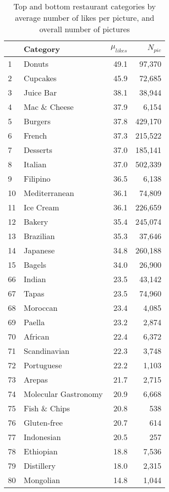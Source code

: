 \documentclass{sig-alternate-2013}
\begin{document}
\begin{table}[t]
\caption{Top and bottom restaurant categories by average number of likes per picture, and overall number of pictures
\label{tbl:categorylikes}}
\begin{center}
\footnotesize
\begin{tabular}{llrr}
\toprule
 & \textbf{Category} & \textbf{$\mu_{likes}$} & \textbf{$N_{pic}$} \\
\midrule
1 & Donuts & 49.1 & 97,370 \\
2 & Cupcakes & 45.9 & 72,685 \\
3 & Juice Bar & 38.1 & 38,944 \\
4 & Mac \& Cheese & 37.9 & 6,154 \\
5 & Burgers & 37.8 & 429,170 \\
6 & French & 37.3 & 215,522 \\
7 & Desserts & 37.0 & 185,141 \\
8 & Italian & 37.0 & 502,339 \\
9 & Filipino & 36.5 & 6,138 \\
10 & Mediterranean & 36.1 & 74,809 \\
11 & Ice Cream & 36.1 & 226,659 \\
12 & Bakery & 35.4 & 245,074 \\
13 & Brazilian & 35.3 & 37,646 \\
14 & Japanese & 34.8 & 260,188 \\
15 & Bagels & 34.0 & 26,900 \\
\midrule
66 & Indian & 23.5 & 43,142 \\
67 & Tapas & 23.5 & 74,960 \\
68 & Moroccan & 23.4 & 4,085 \\
69 & Paella & 23.2 & 2,874 \\
70 & African & 22.4 & 6,372 \\
71 & Scandinavian & 22.3 & 3,748 \\
72 & Portuguese & 22.2 & 1,103 \\
73 & Arepas & 21.7 & 2,715 \\
74 & Molecular Gastronomy & 20.9 & 6,668 \\
75 & Fish \& Chips & 20.8 & 538 \\
76 & Gluten-free & 20.7 & 614 \\
77 & Indonesian & 20.5 & 257 \\
78 & Ethiopian & 18.8 & 7,536 \\
79 & Distillery & 18.0 & 2,315 \\
80 & Mongolian & 14.8 & 1,044 \\
\bottomrule
\end{tabular}
\end{center}
\end{table}
\end{document}
